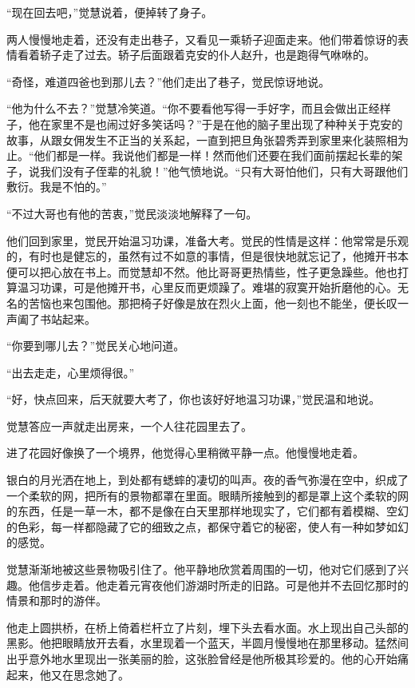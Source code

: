 \par “现在回去吧，”觉慧说着，便掉转了身子。
\par 两人慢慢地走着，还没有走出巷子，又看见一乘轿子迎面走来。他们带着惊讶的表情看着轿子走了过去。轿子后面跟着克安的仆人赵升，也是跑得气咻咻的。
\par “奇怪，难道四爸也到那儿去？”他们走出了巷子，觉民惊讶地说。
\par “他为什么不去？”觉慧冷笑道。“你不要看他写得一手好字，而且会做出正经样子，他在家里不是也闹过好多笑话吗？”于是在他的脑子里出现了种种关于克安的故事，从跟女佣发生不正当的关系起，一直到把旦角张碧秀弄到家里来化装照相为止。“他们都是一样。我说他们都是一样！然而他们还要在我们面前摆起长辈的架子，说我们没有子侄辈的礼貌！”他气愤地说。“只有大哥怕他们，只有大哥跟他们敷衍。我是不怕的。”
\par “不过大哥也有他的苦衷，”觉民淡淡地解释了一句。
\par 他们回到家里，觉民开始温习功课，准备大考。觉民的性情是这样：他常常是乐观的，有时也是健忘的，虽然有过不如意的事情，但是很快地就忘记了，他摊开书本便可以把心放在书上。而觉慧却不然。他比哥哥更热情些，性子更急躁些。他也打算温习功课，可是他摊开书，心里反而更烦躁了。难堪的寂寞开始折磨他的心。无名的苦恼也来包围他。那把椅子好像是放在烈火上面，他一刻也不能坐，便长叹一声阖了书站起来。
\par “你要到哪儿去？”觉民关心地问道。
\par “出去走走，心里烦得很。”
\par “好，快点回来，后天就要大考了，你也该好好地温习功课，”觉民温和地说。
\par 觉慧答应一声就走出房来，一个人往花园里去了。
\par 进了花园好像换了一个境界，他觉得心里稍微平静一点。他慢慢地走着。
\par 银白的月光洒在地上，到处都有蟋蟀的凄切的叫声。夜的香气弥漫在空中，织成了一个柔软的网，把所有的景物都罩在里面。眼睛所接触到的都是罩上这个柔软的网的东西，任是一草一木，都不是像在白天里那样地现实了，它们都有着模糊、空幻的色彩，每一样都隐藏了它的细致之点，都保守着它的秘密，使人有一种如梦如幻的感觉。
\par 觉慧渐渐地被这些景物吸引住了。他平静地欣赏着周围的一切，他对它们感到了兴趣。他信步走着。他走着元宵夜他们游湖时所走的旧路。可是他并不去回忆那时的情景和那时的游伴。
\par 他走上圆拱桥，在桥上倚着栏杆立了片刻，埋下头去看水面。水上现出自己头部的黑影。他把眼睛放开去看，水里现着一个蓝天，半圆月慢慢地在那里移动。猛然间出乎意外地水里现出一张美丽的脸，这张脸曾经是他所极其珍爱的。他的心开始痛起来，他又在思念她了。

